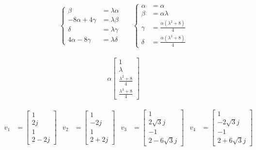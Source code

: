 \documentclass[11pt]{article}
\begin{document}
\begin{align*}
  \begin{cases}
    \beta  &= \lambda \alpha\\
    -8\alpha + 4\gamma &= \lambda \beta\\
    \delta &= \lambda \gamma \\
    4\alpha - 8\gamma &= \lambda \delta
  \end{cases}
  &
  &
  \begin{cases}
    \alpha &= \alpha\\
    \beta  &= \alpha \lambda\\
    \gamma &= \frac{\alpha (\lambda^2 +8)}{4} \\
    \delta &= \frac{\alpha (\lambda^3 +8)}{4}
  \end{cases}
\end{align*}

\begin{align*}
  \alpha
  \begin{bmatrix}
    1\\
    \lambda\\
    \frac{\lambda^2 +8}{4} \\
    \frac{\lambda^3 +8}{4}
  \end{bmatrix}
\end{align*}

\begin{align*}
  v_1 &=
  \begin{bmatrix}
    1\\
    2j\\
    1\\
    2 - 2j
  \end{bmatrix}
  &
  v_2 &=
  \begin{bmatrix}
    1\\
    -2j\\
    1\\
    2 + 2j
  \end{bmatrix}
  &
  v_3 &=
  \begin{bmatrix}
    1\\
    2\sqrt{3}j\\
    -1\\
    2 - 6\sqrt{3}j
  \end{bmatrix}
  &
  v_4 &=
  \begin{bmatrix}
    1\\
    -2\sqrt{3}j\\
    -1\\
    2 + 6\sqrt{3}j
  \end{bmatrix}
\end{align*}
\end{document}
